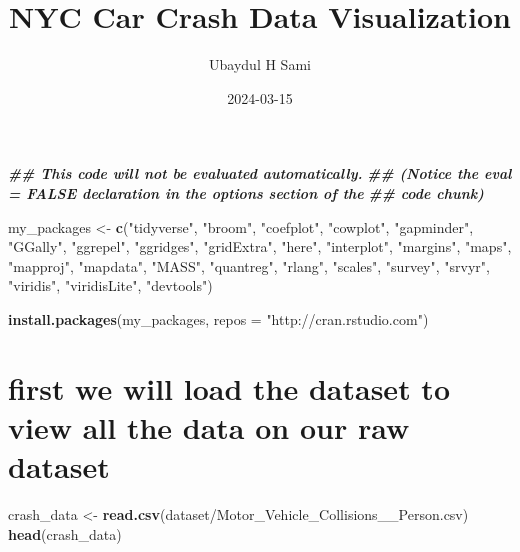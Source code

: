 \documentclass[
]{article}
\title{NYC Car Crash Data Visualization}
\author{Ubaydul H Sami}
\date{2024-03-15}
\newenvironment{Shaded}{\begin{snugshade}}{\end{snugshade}}
\newcommand{\AttributeTok}[1]{\textcolor[rgb]{0.13,0.29,0.53}{#1}}
\newcommand{\DocumentationTok}[1]{\textcolor[rgb]{0.56,0.35,0.01}{\textbf{\textit{#1}}}}
\newcommand{\FunctionTok}[1]{\textcolor[rgb]{0.13,0.29,0.53}{\textbf{#1}}}
\newcommand{\NormalTok}[1]{#1}
\newcommand{\OtherTok}[1]{\textcolor[rgb]{0.56,0.35,0.01}{#1}}
\newcommand{\StringTok}[1]{\textcolor[rgb]{0.31,0.60,0.02}{#1}}
\begin{document}
\maketitle

\begin{Shaded}
\begin{Highlighting}[]
\DocumentationTok{\#\# This code will not be evaluated automatically.}
\DocumentationTok{\#\# (Notice the eval = FALSE declaration in the options section of the}
\DocumentationTok{\#\# code chunk)}

\NormalTok{my\_packages }\OtherTok{\textless{}{-}} \FunctionTok{c}\NormalTok{(}\StringTok{"tidyverse"}\NormalTok{, }\StringTok{"broom"}\NormalTok{, }\StringTok{"coefplot"}\NormalTok{, }\StringTok{"cowplot"}\NormalTok{,}
                 \StringTok{"gapminder"}\NormalTok{, }\StringTok{"GGally"}\NormalTok{, }\StringTok{"ggrepel"}\NormalTok{, }\StringTok{"ggridges"}\NormalTok{, }\StringTok{"gridExtra"}\NormalTok{,}
                 \StringTok{"here"}\NormalTok{, }\StringTok{"interplot"}\NormalTok{, }\StringTok{"margins"}\NormalTok{, }\StringTok{"maps"}\NormalTok{, }\StringTok{"mapproj"}\NormalTok{,}
                 \StringTok{"mapdata"}\NormalTok{, }\StringTok{"MASS"}\NormalTok{, }\StringTok{"quantreg"}\NormalTok{, }\StringTok{"rlang"}\NormalTok{, }\StringTok{"scales"}\NormalTok{,}
                 \StringTok{"survey"}\NormalTok{, }\StringTok{"srvyr"}\NormalTok{, }\StringTok{"viridis"}\NormalTok{, }\StringTok{"viridisLite"}\NormalTok{, }\StringTok{"devtools"}\NormalTok{)}

\FunctionTok{install.packages}\NormalTok{(my\_packages, }\AttributeTok{repos =} \StringTok{"http://cran.rstudio.com"}\NormalTok{)}
\end{Highlighting}
\end{Shaded}

\hypertarget{first-we-will-load-the-dataset-to-view-all-the-data-on-our-raw-dataset}{%
\section{first we will load the dataset to view all the data on our raw
dataset}\label{first-we-will-load-the-dataset-to-view-all-the-data-on-our-raw-dataset}}

\begin{Shaded}
\begin{Highlighting}[]
\NormalTok{crash\_data }\OtherTok{\textless{}{-}} \FunctionTok{read.csv}\NormalTok{(}\StringTok{\textquotesingle{}dataset/Motor\_Vehicle\_Collisions\_\_Person.csv\textquotesingle{}}\NormalTok{)}
\FunctionTok{head}\NormalTok{(crash\_data)}
\end{Highlighting}
\end{Shaded}
\end{document}

